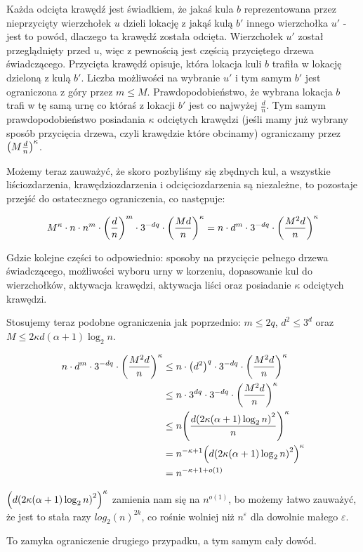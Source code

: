 Każda odcięta krawędź jest świadkiem, że jakaś kula \(b\) reprezentowana przez nieprzycięty wierzchołek \(u\) dzieli lokację z jakąś kulą \(b'\) innego wierzchołka \(u'\) - jest to powód, dlaczego ta krawędź została odcięta.
Wierzchołek \(u'\) został przeglądnięty przed \(u\), więc z pewnością jest częścią przyciętego drzewa świadczącego. Przycięta krawędź opisuje, która lokacja kuli \(b\) trafiła w lokację dzieloną z kulą \(b'\).
Liczba możliwości na wybranie \(u'\) i tym samym \(b'\) jest ograniczona z góry przez \(m \leq M\). Prawdopodobieństwo, że wybrana lokacja \(b\) trafi w tę samą urnę co któraś z lokacji \(b'\) jest co najwyżej \(\frac{d}{n}\).
Tym samym prawdopodobieństwo posiadania \(\kappa\) odciętych krawędzi (jeśli mamy już wybrany sposób przycięcia drzewa, czyli krawędzie które obcinamy) ograniczamy przez \(\left(M\frac{d}{n}\right)^\kappa\).

Możemy teraz zauważyć, że skoro pozbyliśmy się zbędnych kul, a wszystkie liściozdarzenia, krawędziozdarzenia i odcięciozdarzenia są niezależne, to pozostaje przejść do ostatecznego ograniczenia, co następuje:

\begin{align*}
	M^\kappa \cdot n \cdot n^{m} \cdot \left(\frac{d}{n}\right)^m \cdot 3^{-dq} \cdot \left(\frac{Md}{n}\right)^\kappa = n \cdot d^m \cdot 3^{-dq} \cdot \left(\frac{M^2 d}{n}\right)^\kappa \\
\end{align*}

Gdzie kolejne części to odpowiednio: sposoby na przycięcie pełnego drzewa świadczącego, możliwości wyboru urny w korzeniu, dopasowanie kul do wierzchołków, aktywacja krawędzi, aktywacja liści oraz posiadanie \(\kappa\) odciętych krawędzi.

Stosujemy teraz podobne ograniczenia jak poprzednio: \(m \leq 2q\), \(d^2 \leq 3^d\) oraz \(M \leq 2\kappa d(\alpha+1)\log_2n\).

\begin{align*}
	n \cdot d^m \cdot 3^{-dq} \cdot \pars{\frac{M^2 d}{n}}^\kappa & \leq n \cdot \pars{d^{2}}^q \cdot 3^{-dq} \cdot \pars{\frac{M^2 d}{n}}^\kappa \\
	                                                              & \leq n \cdot 3^{dq} \cdot 3^{-dq} \cdot \pars{\frac{M^2 d}{n}}^\kappa         \\
	                                                              & \leq n\pars{\frac{d\pars{2\kappa(\alpha+1)\log_2n}^2}{n}}^\kappa              \\
	                                                              & = n^{-\kappa + 1} \pars{d\pars{2\kappa(\alpha+1)\log_2n}^2}^\kappa            \\
	                                                              & = n^{-\kappa+1+o(1)}
\end{align*}

\(\pars{d\pars{2\kappa(\alpha+1)\log_2n}^2}^\kappa\) zamienia nam się na \(n^{o(1)}\), bo możemy łatwo zauważyć, że jest to stała razy \(log_2(n)^{2k}\), co rośnie wolniej niż \(n^\varepsilon\) dla dowolnie małego \(\varepsilon\).

To zamyka ograniczenie drugiego przypadku, a tym samym cały dowód.